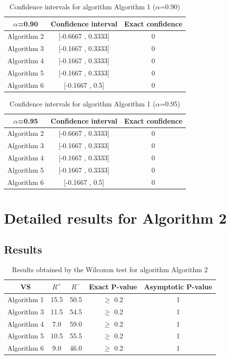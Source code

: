 \documentclass[a4paper,10pt]{article}
\begin{document}
\begin{table}[!htp]
\centering\small
\begin{tabular}{
|c|c|c|}
\hline
 $\alpha$=0.90 & Confidence interval & Exact confidence \\ \hline 
Algorithm 2 & [-0.6667 , 0.3333] & 0\\ \hline 
Algorithm 3 & [-0.1667 , 0.3333] & 0\\ \hline 
Algorithm 4 & [-0.1667 , 0.3333] & 0\\ \hline 
Algorithm 5 & [-0.1667 , 0.3333] & 0\\ \hline 
Algorithm 6 & [-0.1667 , 0.5] & 0\\ \hline 

\end{tabular}
\caption{Confidence intervals for algorithm Algorithm 1 ($\alpha$=0.90)}
\end{table}
\begin{table}[!htp]
\centering\small
\begin{tabular}{
|c|c|c|}
\hline
 $\alpha$=0.95 & Confidence interval & Exact confidence \\ \hline 
Algorithm 2 & [-0.6667 , 0.3333] & 0\\ \hline 
Algorithm 3 & [-0.1667 , 0.3333] & 0\\ \hline 
Algorithm 4 & [-0.1667 , 0.3333] & 0\\ \hline 
Algorithm 5 & [-0.1667 , 0.3333] & 0\\ \hline 
Algorithm 6 & [-0.1667 , 0.5] & 0\\ \hline 

\end{tabular}
\caption{Confidence intervals for algorithm Algorithm 1 ($\alpha$=0.95)}
\end{table}

 \clearpage 


\section{Detailed results for Algorithm 2}


\subsection{Results}

\begin{table}[!htp]
\centering\small
\begin{tabular}{
|c|c|c|c|c|}
\hline
 VS & $R^{+}$ & $R^{-}$ & Exact P-value & Asymptotic P-value \\ \hline 
Algorithm 1 & 15.5 & 50.5 & $\geq$ 0.2 & 1\\ \hline 
Algorithm 3 & 11.5 & 54.5 & $\geq$ 0.2 & 1\\ \hline 
Algorithm 4 & 7.0 & 59.0 & $\geq$ 0.2 & 1\\ \hline 
Algorithm 5 & 10.5 & 55.5 & $\geq$ 0.2 & 1\\ \hline 
Algorithm 6 & 9.0 & 46.0 & $\geq$ 0.2 & 1\\ \hline 

\end{tabular}
\caption{Results obtained by the Wilcoxon test for algorithm Algorithm 2}
\end{table}
\end{document}
